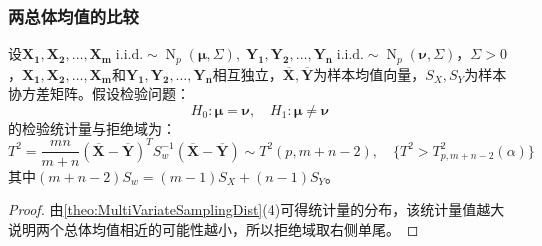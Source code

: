 \subsubsection{两总体均值的比较}
\begin{theorem}
	设$\mathbf{X_1},\mathbf{X_2},\dots,\mathbf{X_m}\;\text{i.i.d.}\sim\operatorname{N}_p(\boldsymbol{\mu},\Sigma),\;\mathbf{Y_1},\mathbf{Y_2},\dots,\mathbf{Y_n}\;\text{i.i.d.}\sim\operatorname{N}_p(\boldsymbol{\nu},\Sigma)$，$\Sigma>0$，$\mathbf{X_1},\mathbf{X_2},\dots,\mathbf{X_m}$和$\mathbf{Y_1},\mathbf{Y_2},\dots,\mathbf{Y_n}$相互独立，$\overline{\mathbf{X}},\overline{\mathbf{Y}}$为样本均值向量，$S_X,S_Y$为样本协方差矩阵。假设检验问题：
	\begin{equation*}
		H_0:\boldsymbol{\mu}=\boldsymbol{\nu},\quad H_1:\boldsymbol{\mu}\ne\boldsymbol{\nu}
	\end{equation*}
	的检验统计量与拒绝域为：
	\begin{equation*}
		T^2=\frac{mn}{m+n}(\overline{\mathbf{X}}-\overline{\mathbf{Y}})^TS_{w}^{-1}(\overline{\mathbf{X}}-\overline{\mathbf{Y}})\sim T^2(p,m+n-2),\quad\{T^2>T^2_{p,m+n-2}(\alpha)\}
	\end{equation*}
	其中$(m+n-2)S_w=(m-1)S_X+(n-1)S_Y$。
\end{theorem}
\begin{proof}
	由\cref{theo:MultiVariateSamplingDist}(4)可得统计量的分布，该统计量值越大说明两个总体均值相近的可能性越小，所以拒绝域取右侧单尾。
\end{proof}
